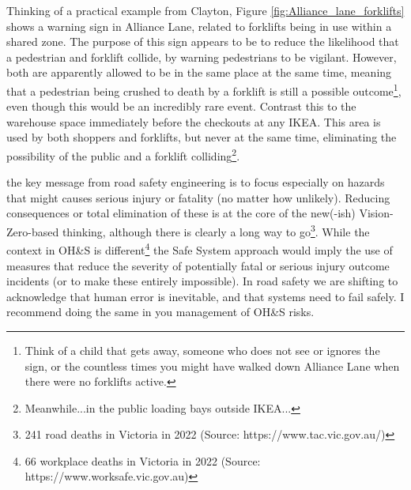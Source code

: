 \documentclass{tufte-handout}
\begin{document}
Thinking of a practical example from Clayton,  Figure \ref{fig:Alliance_lane_forklifts} shows a warning sign in Alliance Lane, related to forklifts being in use within a shared zone. The purpose of this sign appears to be to reduce the likelihood that a pedestrian and forklift collide, by warning pedestrians to be vigilant. However, both are apparently allowed to be in the same place at the same time, meaning that a pedestrian being crushed to death by a forklift is still a possible outcome\footnote{Think of a child that gets away, someone who does not see or ignores the sign, or the countless times you might have walked down Alliance Lane when there were no forklifts active.}, even though this would be an incredibly rare event. Contrast this to the warehouse space immediately before the checkouts at any IKEA. This area is used by both shoppers and forklifts, but never at the same time, eliminating the possibility of the public and a forklift colliding\footnote{Meanwhile...in the public loading bays outside IKEA...}. 


 the key message from road safety engineering is to focus especially on hazards that might causes serious injury or fatality (no matter how unlikely). Reducing consequences or total elimination of these is at the core of the new(-ish) Vision-Zero-based thinking, although there is clearly a long way to go\footnote{241 road deaths in Victoria in 2022 (Source: https://www.tac.vic.gov.au/)}. While the context in OH\&S is different\footnote{66 workplace deaths in Victoria in 2022 (Source: https://www.worksafe.vic.gov.au)} the Safe System approach would imply the use of measures that reduce the severity of potentially fatal or serious injury outcome incidents (or to make these entirely impossible). In road safety we are shifting to acknowledge that human error is inevitable, and that systems need to fail safely. I recommend doing the same in you management of OH\&S risks.




\end{document}
